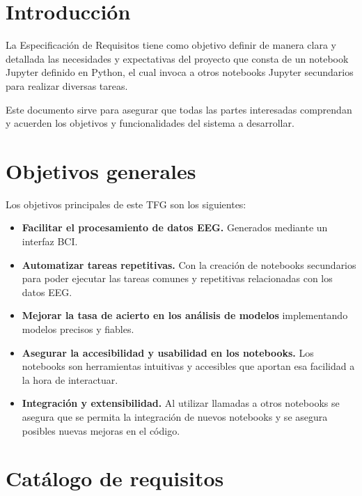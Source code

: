 
\section{Introducción}

La Especificación de Requisitos tiene como objetivo definir de manera clara y detallada las necesidades y expectativas del proyecto que consta de un notebook Jupyter definido en Python, el cual invoca a otros notebooks Jupyter secundarios para realizar diversas tareas. 

Este documento sirve para asegurar que todas las partes interesadas comprendan y acuerden los objetivos y funcionalidades del sistema a desarrollar.



\section{Objetivos generales}

Los objetivos principales de este TFG son los siguientes:

\begin{itemize}
\tightlist
\item
	\textbf{Facilitar el procesamiento de datos EEG.} Generados mediante un interfaz BCI.  	
\item
 	\textbf{Automatizar tareas repetitivas.} Con la creación de notebooks secundarios para poder ejecutar las tareas comunes y repetitivas relacionadas con los datos EEG. 
\item
	\textbf{Mejorar la tasa de acierto en los análisis de modelos} implementando modelos precisos y fiables. 
\item
	\textbf{Asegurar la accesibilidad y usabilidad en los notebooks.} Los notebooks son herramientas intuitivas y accesibles que aportan esa facilidad a la hora de interactuar.
\item
	\textbf{Integración y extensibilidad.} Al utilizar llamadas a otros notebooks se asegura que se permita la integración de nuevos notebooks y se asegura posibles nuevas mejoras en el código.
		
\end{itemize}



\section{Catálogo de requisitos}

